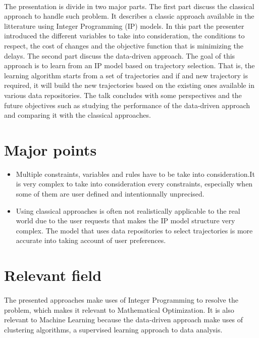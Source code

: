 \documentclass[11pt,a4paper]{article}
\begin{document}
\paragraph{}


The presentation is divide in two major parts. The first part discuss the classical approach to handle such problem. It describes a classic approach available in the litterature using Integer Programming (IP) models. In this part the presenter introduced the different variables to take into consideration, the conditions to respect, the cost of changes and the objective function that is minimizing the delays. The second part discuss the data-driven approach. The goal of this approach is to learn from an IP model based on trajectory selection. That is, the learning algorithm starts from a set of trajectories and if and new trajectory is required, it will build the new trajectories based on the existing ones available in various data repositories. The talk concludes with some perspectives and the future objectives such as studying the performance of the data-driven approach and comparing it with the classical approaches.

\section{Major points}

\begin{itemize}
  \item Multiple constraints, variables and rules have to be take into consideration.It is very complex to take into consideration every constraints, especially when some of them are user defined and intentionnally unprecised.
  \item Using classical approaches is often not realistically applicable to the real world due to the user requests that makes the IP model structure very complex. The model that uses data repositories to select trajectories is more accurate into taking account of user preferences.
\end{itemize}

\section{Relevant field}

\paragraph{}

The presented approaches make uses of Integer Programming to resolve the problem, which makes it relevant to Mathematical Optimization. It is also relevant to Machine Learning because the data-driven approach make uses of clustering algorithms, a supervised learning approach to data analysis.
\end{document}
